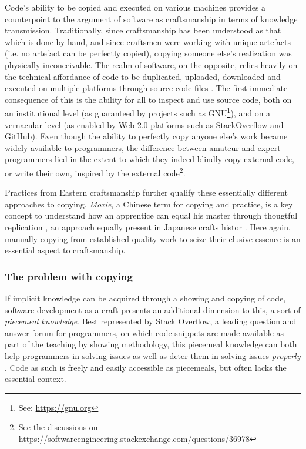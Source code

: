 Code's ability to be copied and executed on various machines provides a counterpoint to the argument of software as craftsmanship in terms of knowledge transmission. Traditionally, since craftsmanship has been understood as that which is done by hand, and since craftsmen were working with unique artefacts (i.e. no artefact can be perfectly copied), copying someone else's realization was physically inconceivable. The realm of software, on the opposite, relies heavily on the technical affordance of code to be duplicated, uploaded, downloaded and executed on multiple platforms through source code files \citep{manovich_language_2001}. The first immediate consequence of this is the ability for all to inspect and use source code, both on an institutional level (as guaranteed by projects such as GNU\footnote{See: \url{https://gnu.org}}), and on a vernacular level (as enabled by Web 2.0 platforms such as StackOverflow and GitHub). Even though the ability to perfectly copy anyone else's work became widely available to programmers, the difference between amateur and expert programmers lied in the extent to which they indeed blindly copy external code, or write their own, inspired by the external code\footnote{See the discussions on \url{https://softwareengineering.stackexchange.com/questions/36978}}.

Practices from Eastern craftsmanship further qualify these essentially different approaches to copying. \emph{Moxie}, a Chinese term for copying and practice, is a key concept to understand how an apprentice can equal his master through thougtful replication  \citep{man_influence_2015}, an approach equally present in Japanese crafts histor \citep{jordan_copying_2003}. Here again, manually copying from established quality work to seize their elusive essence is an essential aspect to craftsmanship.

\subsubsection{The problem with copying}
\label{subsubsec:craft-copying}

If implicit knowledge can be acquired through a showing and copying of code, software development as a craft presents an additional dimension to this, a sort of \emph{piecemeal knowledge}. Best represented by Stack Overflow, a leading question and answer forum for programmers, on which code snippets are made available as part of the teaching by showing methodology, this piecemeal knowledge can both help programmers in solving issues as well as deter them in solving issues \textit{properly} \citep{treude_understanding_2017}. Code as such is freely and easily accessible as piecemeals, but often lacks the essential context.

